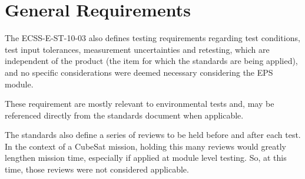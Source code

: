 %
%
%
%
%

%
%
%
%
%

\chapter{General Requirements} \label{ch:general-requirements}

The ECSS-E-ST-10-03 \cite{ecss-e-st-10-03} also defines testing requirements regarding test conditions, test input tolerances, measurement uncertainties and retesting, which are independent of the product (the item for which the standards are being applied), and no specific considerations were deemed necessary considering the EPS module.

These requirement are mostly relevant to environmental tests and, may be referenced directly from the standards document \cite{ecss-e-st-10-03} when applicable.

The standards also define a series of reviews to be held before and after each test.
In the context of a CubeSat mission, holding this many reviews would greatly lengthen mission time, especially if applied at module level testing.
So, at this time, those reviews were not considered applicable.